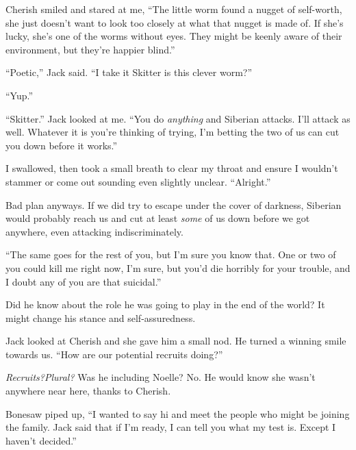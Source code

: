 Cherish smiled and stared at me, ``The little worm found a nugget of self-worth, she just doesn't want to look too closely at what that nugget is made of.  If she's lucky, she's one of the worms without eyes.  They might be keenly aware of their environment, but they're happier blind.''



``Poetic,'' Jack said.  ``I take it Skitter is this clever worm?''



``Yup.''



``Skitter.'' Jack looked at me.  ``You do \emph{anything} and Siberian attacks.  I'll attack as well.  Whatever it is you're thinking of trying, I'm betting the two of us can cut you down before it works.''



I swallowed, then took a small breath to clear my throat and ensure I wouldn't stammer or come out sounding even slightly unclear.  ``Alright.''



Bad plan anyways.  If we did try to escape under the cover of darkness, Siberian would probably reach us and cut at least \emph{some} of us down before we got anywhere, even attacking indiscriminately.



``The same goes for the rest of you, but I'm sure you know that.  One or two of you could kill me right now, I'm sure, but you'd die horribly for your trouble, and I doubt any of you are that suicidal.''



Did he know about the role he was going to play in the end of the world?  It might change his stance and self-assuredness.



Jack looked at Cherish and she gave him a small nod.  He turned a winning smile towards us.  ``How are our potential recruits doing?''



\emph{Recruits?}\emph{Plural?}  Was he including Noelle?  No.  He would know she wasn't anywhere near here, thanks to Cherish.



Bonesaw piped up, ``I wanted to say hi and meet the people who might be joining the family.  Jack said that if I'm ready, I can tell you what my test is.  Except I haven't decided.''



